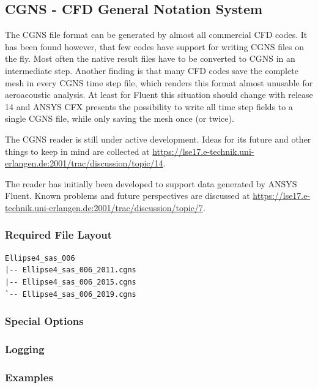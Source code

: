 \documentclass[a4paper,10pt]{article}
\begin{document}
\newpage
\subsection{CGNS - CFD General Notation System}
\label{sec:cgns}

The CGNS file  format can be generated by almost all  commercial CFD codes. It
has been found however, that few  codes have support for writing CGNS files on
the fly. Most often the native result files have to be converted to CGNS in an
intermediate step.  Another  finding is that many CFD  codes save the complete
mesh in every  CGNS time step file, which renders  this format almost unusable
for aeroacoustic  analysis. At least  for Fluent this situation  should change
with release 14 and ANSYS CFX  presents the possibility to write all time step
fields to a single CGNS file, while only saving the mesh once (or twice).

The CGNS  reader is still under  active development. Ideas for  its future and
other     things     to     keep      in     mind     are     collected     at
\url{https://lse17.e-technik.uni-erlangen.de:2001/trac/discussion/topic/14}.

The reader  has initially  been developed to  support data generated  by ANSYS
Fluent.   Known   problems   and   future  perspectives   are   discussed   at
\url{https://lse17.e-technik.uni-erlangen.de:2001/trac/discussion/topic/7}.


\subsubsection{Required File Layout}

\begin{verbatim}
Ellipse4_sas_006
|-- Ellipse4_sas_006_2011.cgns
|-- Ellipse4_sas_006_2015.cgns
`-- Ellipse4_sas_006_2019.cgns
\end{verbatim}

\subsubsection{Special Options}

\subsubsection{Logging} 

\subsubsection{Examples}
\end{document}
